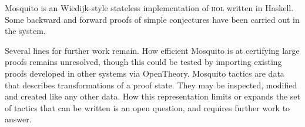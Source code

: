 \documentclass{llncs}
\newcommand{\mosquito}{Mosquito\xspace}
\begin{document}
\mosquito is an Wiedijk-style stateless implementation of \textsc{hol} written in Haskell.
Some backward and forward proofs of simple conjectures have been carried out in the system.

Several lines for further work remain.
How efficient \mosquito is at certifying large proofs remains unresolved, though this could be tested by importing existing proofs developed in other systems via OpenTheory.
\mosquito tactics are data that describes transformations of a proof state.
They may be inspected, modified and created like any other data.
How this representation limits or expands the set of tactics that can be written is an open question, and requires further work to answer.


\end{document}
